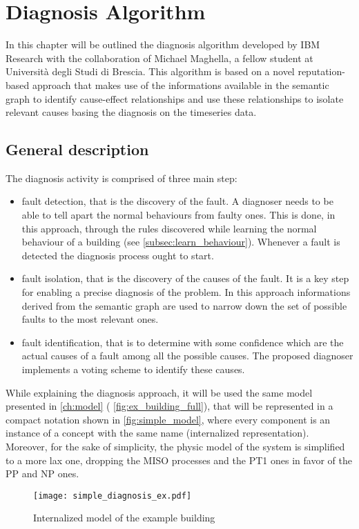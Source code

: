 \chapter{Diagnosis Algorithm} \label{ch:diagnosis}
In this chapter will be outlined the diagnosis algorithm\cite{semantic_diagnoser} developed by IBM Research with the collaboration of Michael Maghella, a fellow student at Università degli Studi di Brescia. This algorithm is based on a novel reputation-based approach that makes use of the informations available in the semantic graph to identify cause-effect relationships and use these relationships to isolate relevant causes basing the diagnosis on the timeseries data.
\section{General description}
The diagnosis activity is comprised of three main step:
\begin{itemize}
  \item fault detection, that is the discovery of the fault. A diagnoser needs to be able to tell apart the normal behaviours from faulty ones. This is done, in this approach, through the rules discovered while learning the normal behaviour of a building (see \autoref{subsec:learn_behaviour}). Whenever a fault is detected the diagnosis process ought to start.
  \item fault isolation, that is the discovery of the causes of the fault. It is a key step for enabling a precise diagnosis of the problem. In this approach informations derived from the semantic graph are used to narrow down the set of possible faults to the most relevant ones.
  \item fault identification, that is to determine with some confidence which are the actual causes of a fault among all the possible causes. The proposed diagnoser implements a voting scheme to identify these causes.
\end{itemize}
While explaining the diagnosis approach, it will be used the same model presented in \autoref{ch:model} ( \autoref{fig:ex_building_full}), that will be represented in a compact notation shown in \autoref{fig:simple_model}, where every component is an instance of a concept with the same name (internalized representation). Moreover, for the sake of simplicity, the physic model of the system is simplified to a more lax one, dropping the MISO processes and the PT1 ones in favor of the PP and NP ones.
\begin{figure}
  \texttt{[image: simple\_diagnosis\_ex.pdf]}
  \caption{Internalized model of the example building}
  \label{fig:simple_model}
\end{figure}
